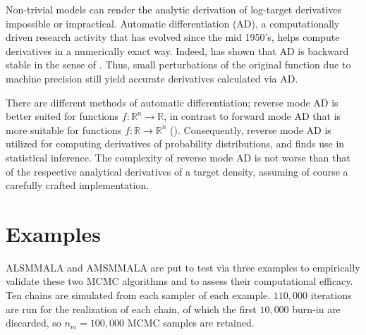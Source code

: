 \documentclass[twoside,11pt]{article}
\begin{document}
{Non-trivial models can render the analytic derivation of log-target derivatives impossible or impractical. Automatic
differentiation (AD), a computationally driven research activity that has evolved since the mid 1950's, helps compute 
derivatives in a numerically exact way. Indeed, \cite{gri__ona} has shown that AD is backward stable in the sense of 
\cite{wil__mod}. Thus, small perturbations of the original function due to machine precision still yield accurate 
derivatives calculated via AD.

There are different methods of automatic differentiation; reverse mode AD is better suited for functions
$f:\mathbb{R}^n\rightarrow\mathbb{R}$, in contrast to forward mode AD that is more suitable for functions 
$f:\mathbb{R}\rightarrow\mathbb{R}^n$ (\cite{gri_wal__eva}). Consequently, reverse mode AD is utilized for computing 
derivatives of probability distributions, and finds use in statistical inference. The complexity of reverse mode AD is not
worse than that of the respective analytical derivatives of a target density, assuming of course a carefully crafted
implementation.


\section{Examples}
\label{Examples}

ALSMMALA and AMSMMALA are put to test via three examples to empirically validate these two MCMC algorithms and to assess 
their computational efficacy. Ten chains are simulated from each sampler of each example. $110,000$ iterations are run for 
the realization of each chain, of which the first $10,000$ burn-in are discarded, so $n_m=100,000$ MCMC samples are retained.

}
\end{document}
